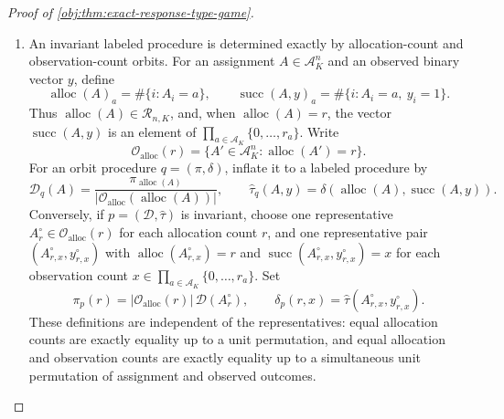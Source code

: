 \documentclass[11pt]{article}
\begin{document}
\begin{proof}[Proof of \cref{obj:thm:exact-response-type-game}]
\begin{enumerate}
Apply this with \(y=Y^{\mathrm{obs}}(z,A)\) and \(\theta=\tau_c(z)\), then sum over \(A\).  The identities
\[
\tau_c(\sigma z)=\tau_c(z),
\qquad
Y^{\mathrm{obs}}(\sigma z,\sigma A)=
\sigma Y^{\mathrm{obs}}(z,A)
\]
convert the right-hand side into the permutation average of labeled risks:
\[
R_n(\bar p;z)
\le
\frac{1}{|\mathfrak S_n|}
\sum_{\sigma\in\mathfrak S_n}R_n(p;\sigma z).
\]
Let \(q\) be the orbit procedure obtained by collapsing the invariant procedure \(\bar p\) to allocation and observation counts.  For this collapsed procedure, the labeled and orbit descriptions put the same total probability on each allocation-count and observation-count fiber, so summing the squared loss over those fibers gives
\[
R_n(q;\operatorname{counts}(z))=R_n(\bar p;z).
\]
Hence \(q\) is dominated by the averaged invariant representative. %

\item An invariant labeled procedure is determined exactly by allocation-count and observation-count orbits.  For an assignment \(A\in\mathcal A_K^n\) and an observed binary vector \(y\), define
\[
\operatorname{alloc}(A)_a=\#\{i:A_i=a\},
\qquad
\operatorname{succ}(A,y)_a=\#\{i:A_i=a,\ y_i=1\}.
\]
Thus \(\operatorname{alloc}(A)\in\mathcal R_{n,K}\), and, when \(\operatorname{alloc}(A)=r\), the vector \(\operatorname{succ}(A,y)\) is an element of \(\prod_{a\in\mathcal A_K}\{0,\ldots,r_a\}\).  Write
\[
\mathcal O_{\mathrm{alloc}}(r)
=
\{A'\in\mathcal A_K^n:\operatorname{alloc}(A')=r\}.
\]
For an orbit procedure \(q=(\pi,\delta)\), inflate it to a labeled procedure by
\[
\mathcal D_q(A)=
\frac{\pi_{\operatorname{alloc}(A)}}{
|\mathcal O_{\mathrm{alloc}}(\operatorname{alloc}(A))|},
\qquad
\widehat\tau_q(A,y)=
\delta(\operatorname{alloc}(A),\operatorname{succ}(A,y)).
\]
Conversely, if \(p=(\mathcal D,\widehat\tau)\) is invariant, choose one representative \(A_r^\circ\in\mathcal O_{\mathrm{alloc}}(r)\) for each allocation count \(r\), and one representative pair \((A_{r,x}^\circ,y_{r,x}^\circ)\) with \(\operatorname{alloc}(A_{r,x}^\circ)=r\) and \(\operatorname{succ}(A_{r,x}^\circ,y_{r,x}^\circ)=x\) for each observation count \(x\in\prod_{a\in\mathcal A_K}\{0,\ldots,r_a\}\).  Set
\[
\pi_p(r)=
|\mathcal O_{\mathrm{alloc}}(r)|\,\mathcal D(A_r^\circ),
\qquad
\delta_p(r,x)=\widehat\tau(A_{r,x}^\circ,y_{r,x}^\circ).
\]
These definitions are independent of the representatives: equal allocation counts are exactly equality up to a unit permutation, and equal allocation and observation counts are exactly equality up to a simultaneous unit permutation of assignment and observed outcomes.


\end{enumerate}
\end{proof}
\end{document}
